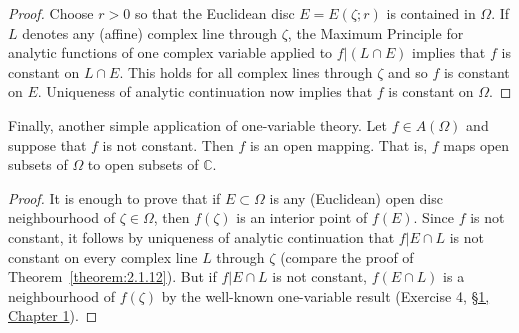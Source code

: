 \begin{proof}
Choose $r>0$ so that the Euclidean disc $E=E(\zeta;r)$ is contained in $\Omega$. If $L$ denotes any (affine) complex line through $\zeta$, the Maximum Principle for analytic functions of one complex variable applied to $f|(L\cap E)$ implies that $f$ is constant on $L\cap E$. This holds for all complex lines through $\zeta$ and so $f$ is constant on $E$. Uniqueness of analytic continuation now implies that $f$ is constant on $\Omega$.
\end{proof}
Finally, another simple application of one-variable theory.
 Let $f\in A(\Omega)$ and suppose that $f$ is not constant. Then $f$ is an open mapping. That is, $f$ maps open subsets of $\Omega$ to open subsets of $\mathbb C$.
\begin{proof}
It is enough to prove that if $E\subset\Omega$ is any (Euclidean) open disc neighbourhood of $\zeta\in\Omega$, then $f(\zeta)$ is an interior point of $f(E)$. Since $f$ is not constant, it follows by uniqueness of analytic continuation
that $f|E\cap L$ is not constant on every complex line $L$ through $\zeta$ (compare the proof of Theorem~\ref{theorem:2.1.12}). But if $f|E\cap L$ is not constant, $f(E\cap L)$ is a neighbourhood of $f(\zeta)$ by the well-known one-variable result (Exercise 4, \hyperref[sec:1:1]{\S1, Chapter 1}).
\end{proof}
